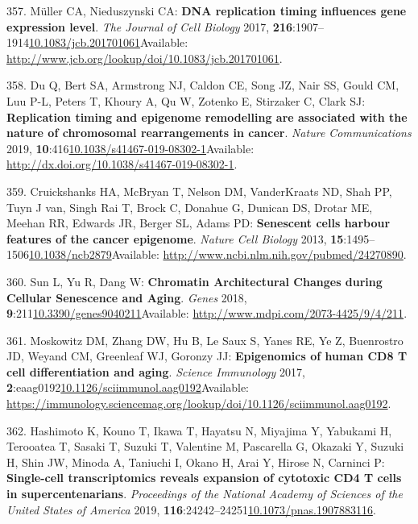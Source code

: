 \documentclass[
]{book}
\begin{document}
\leavevmode\hypertarget{ref-Muller2017}{}%
357. Müller CA, Nieduszynski CA: \textbf{DNA replication timing influences gene expression level}. \emph{The Journal of Cell Biology} 2017, \textbf{216}:1907--1914\href{https://doi.org/10.1083/jcb.201701061}{10.1083/jcb.201701061}Available: \url{http://www.jcb.org/lookup/doi/10.1083/jcb.201701061}.

\leavevmode\hypertarget{ref-Du2019}{}%
358. Du Q, Bert SA, Armstrong NJ, Caldon CE, Song JZ, Nair SS, Gould CM, Luu P-L, Peters T, Khoury A, Qu W, Zotenko E, Stirzaker C, Clark SJ: \textbf{Replication timing and epigenome remodelling are associated with the nature of chromosomal rearrangements in cancer}. \emph{Nature Communications} 2019, \textbf{10}:416\href{https://doi.org/10.1038/s41467-019-08302-1}{10.1038/s41467-019-08302-1}Available: \url{http://dx.doi.org/10.1038/s41467-019-08302-1}.

\leavevmode\hypertarget{ref-Cruickshanks2013}{}%
359. Cruickshanks HA, McBryan T, Nelson DM, VanderKraats ND, Shah PP, Tuyn J van, Singh Rai T, Brock C, Donahue G, Dunican DS, Drotar ME, Meehan RR, Edwards JR, Berger SL, Adams PD: \textbf{Senescent cells harbour features of the cancer epigenome}. \emph{Nature Cell Biology} 2013, \textbf{15}:1495--1506\href{https://doi.org/10.1038/ncb2879}{10.1038/ncb2879}Available: \url{http://www.ncbi.nlm.nih.gov/pubmed/24270890}.

\leavevmode\hypertarget{ref-Sun2018}{}%
360. Sun L, Yu R, Dang W: \textbf{Chromatin Architectural Changes during Cellular Senescence and Aging}. \emph{Genes} 2018, \textbf{9}:211\href{https://doi.org/10.3390/genes9040211}{10.3390/genes9040211}Available: \url{http://www.mdpi.com/2073-4425/9/4/211}.

\leavevmode\hypertarget{ref-Moskowitz2017}{}%
361. Moskowitz DM, Zhang DW, Hu B, Le Saux S, Yanes RE, Ye Z, Buenrostro JD, Weyand CM, Greenleaf WJ, Goronzy JJ: \textbf{Epigenomics of human CD8 T cell differentiation and aging}. \emph{Science Immunology} 2017, \textbf{2}:eaag0192\href{https://doi.org/10.1126/sciimmunol.aag0192}{10.1126/sciimmunol.aag0192}Available: \url{https://immunology.sciencemag.org/lookup/doi/10.1126/sciimmunol.aag0192}.

\leavevmode\hypertarget{ref-Hashimoto2019}{}%
362. Hashimoto K, Kouno T, Ikawa T, Hayatsu N, Miyajima Y, Yabukami H, Terooatea T, Sasaki T, Suzuki T, Valentine M, Pascarella G, Okazaki Y, Suzuki H, Shin JW, Minoda A, Taniuchi I, Okano H, Arai Y, Hirose N, Carninci P: \textbf{Single-cell transcriptomics reveals expansion of cytotoxic CD4 T cells in supercentenarians}. \emph{Proceedings of the National Academy of Sciences of the United States of America} 2019, \textbf{116}:24242--24251\href{https://doi.org/10.1073/pnas.1907883116}{10.1073/pnas.1907883116}.
\end{document}
